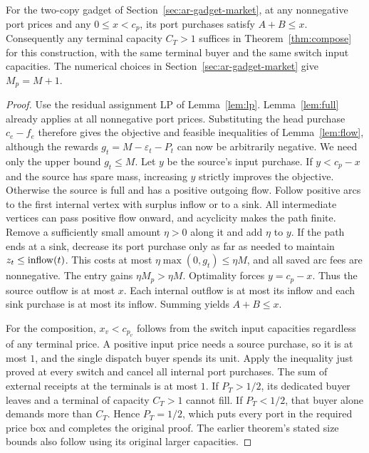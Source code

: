 \begin{lemma}\label{rem:ar-smallterm}
For the two-copy gadget of Section~\ref{sec:ar-gadget-market}, at any
nonnegative port prices and any $0\le x<c_p$, its port purchases satisfy
$A+B\le x$. Consequently any terminal capacity $C_T>1$ suffices in
Theorem~\ref{thm:compose} for this construction, with the same terminal
buyer and the same switch input capacities.
The numerical choices in Section~\ref{sec:ar-gadget-market} give $M_p=M+1$.
\end{lemma}
\par
\begin{proof}
Use the residual assignment LP of Lemma~\ref{lem:lp}. Lemma~\ref{lem:full}
already applies at all nonnegative port prices. Substituting the head
purchase $c_e-f_e$ therefore gives the objective and feasible inequalities
of Lemma~\ref{lem:flow}, although the rewards $g_t=M-\varepsilon_t-P_t$
can now be arbitrarily negative. We need only the upper bound $g_t\le M$.
Let $y$ be the source's input purchase. If $y<c_p-x$ and the source has
spare mass, increasing $y$ strictly improves the objective. Otherwise the
source is full and has a positive outgoing flow. Follow positive arcs to
the first internal vertex with surplus inflow or to a sink. All intermediate
vertices can pass positive flow onward, and acyclicity makes the path finite.
Remove a sufficiently small amount $\eta>0$ along it and add $\eta$ to $y$.
If the path ends at a sink, decrease its port purchase only as far as needed
to maintain $z_t\le\mathrm{inflow}(t)$. This costs at most $\eta\max(0,g_t)\le\eta M$,
and all saved arc fees are nonnegative. The entry gains $\eta M_p>\eta M$.
Optimality forces $y=c_p-x$. Thus the source outflow is at most $x$.
Each internal outflow is at most its inflow and each sink purchase is at
most its inflow. Summing yields $A+B\le x$.

For the composition, $x_v<c_{p_v}$ follows from the switch input capacities
regardless of any terminal price. A positive input price needs a source
purchase, so it is at most $1$, and the single dispatch buyer spends its unit.
Apply the inequality just proved at every switch and cancel all internal
port purchases. The sum of external receipts at the terminals is at most
$1$. If $P_T>1/2$, its dedicated buyer leaves and a terminal of capacity
$C_T>1$ cannot fill. If $P_T<1/2$, that buyer alone demands more than $C_T$.
Hence $P_T=1/2$, which puts every port in the required price box and
completes the original proof. The earlier theorem's stated size bounds
also follow using its original larger capacities.
\end{proof}
